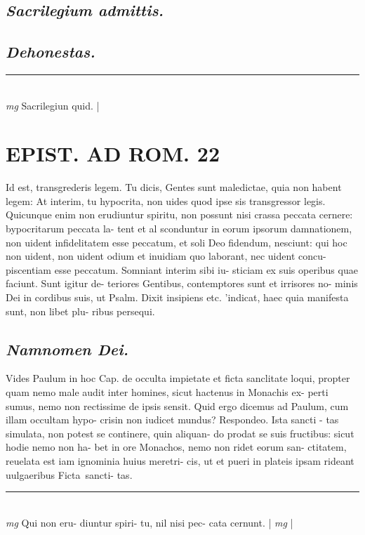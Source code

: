 \documentclass{article}
\begin{document}
\begin{pages}
\subsection*{\textit{Sacrilegium admittis. }}
{}
\subsection*{\textit{Dehonestas. }}
\vspace{0.5cm}\noindent
\vspace{0.2cm}\rule{1cm}{0.2pt}\\ 
\hspace{0.2cm}\textit{mg}
\footnotesize Sacrilegiun quid.  
\normalsize| 
\section*{EPIST. AD ROM.  22 }
\marginpar{[ p.]}\pstart Id est, transgrederis legem. Tu dicis, Gentes sunt maledictae, quia non habent legem: At interim, tu hypocrita, non uides quod ipse sis transgressor legis.  Quicunque enim non erudiuntur spiritu, non possunt nisi crassa peccata cernere: bypocritarum peccata la- tent et al sconduntur in eorum ipsorum damnationem, non uident infidelitatem esse peccatum, et soli Deo fidendum, nesciunt: qui hoc non uident, non uident odium et inuidiam quo laborant, nec uident concu- piscentiam esse peccatum. Somniant interim sibi iu- sticiam ex suis operibus quae faciunt. Sunt igitur de- teriores Gentibus, contemptores sunt et irrisores no- minis Dei in cordibus suis, ut Psalm. Dixit insipiens etc. 'indicat, haec quia manifesta sunt, non libet plu- ribus persequi.   \pend
{}
{}
\subsection*{\textit{Namnomen Dei. }}\pstart Vides Paulum in hoc Cap. de occulta impietate et ficta sanclitate loqui, propter quam nemo male audit inter homines, sicut hactenus in Monachis ex- perti sumus, nemo non rectissime de ipsis sensit. Quid ergo dicemus ad Paulum, cum illam occultam hypo- crisin non iudicet mundus? Respondeo. Ista sancti - tas simulata, non potest se continere, quin aliquan- do prodat se suis fructibus: sicut hodie nemo non ha- bet in ore Monachos, nemo non ridet eorum san- ctitatem, reuelata est iam ignominia huius meretri- cis, ut et pueri in plateis ipsam rideant uulgaeribus Ficta sancti- tas.   \pend
\vspace{0.5cm}\noindent
\vspace{0.2cm}\rule{1cm}{0.2pt}\\ 
\hspace{0.2cm}\textit{mg}
\footnotesize Qui non eru- diuntur spiri- tu, nil nisi pec- cata cernunt.  
\normalsize| 
\hspace{0.2cm}\textit{mg}
\footnotesize 
\normalsize| 

\end{pages}
\end{document}
